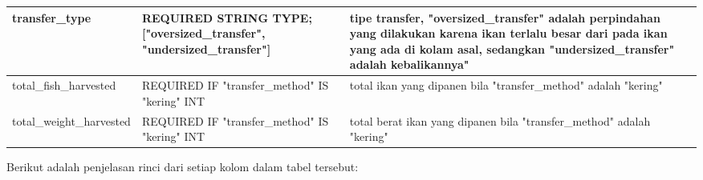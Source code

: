 \begin{enumerate}[1.]
\begin{longtable}{| l | p{5cm} | p{5cm} |}
transfer\_type           & REQUIRED STRING TYPE; {[}"oversized\_transfer", "undersized\_transfer"{]}                                                                                    & tipe transfer, "oversized\_transfer" adalah perpindahan yang dilakukan karena ikan terlalu besar dari pada ikan yang ada di kolam asal, sedangkan "undersized\_transfer" adalah kebalikannya" \\ \hline
total\_fish\_harvested   & REQUIRED IF "transfer\_method" IS "kering" INT                                                                                                              & total ikan yang dipanen bila "transfer\_method" adalah "kering"                                                                                                                               \\ \hline
total\_weight\_harvested & REQUIRED IF "transfer\_method" IS "kering" INT                                                                                                              & total berat ikan yang dipanen bila "transfer\_method" adalah "kering"                                                                                                                         \\ \hline

\end{longtable}


Berikut adalah penjelasan rinci dari setiap kolom dalam tabel tersebut:


\end{enumerate}
